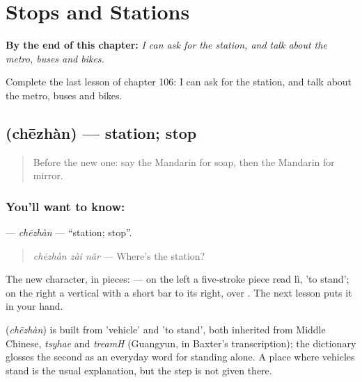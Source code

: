 
\chapter{Stops and Stations}
\label{ch:zh-stops-and-stations}

\begin{chapteropening}
\textbf{By the end of this chapter:} \emph{I can ask for the station, and talk about the metro, buses and bikes.}

Complete the last lesson of chapter 106: I can ask for the station, and talk about the metro, buses and bikes.
\end{chapteropening}

\section[\texorpdfstring{\zh{车站} (chēzhàn)}{车站 (chēzhàn)}]{ (chēzhàn) — station; stop}

\label{lesson:ZH-C106-chezhan}



\begin{quote}
Before the new one: say the Mandarin for soap, then the Mandarin for mirror.
\end{quote}

\subsection*{You'll want to know: }
\textbf{} — \emph{chēzhàn} — \textquotedblleft{}station; stop\textquotedblright{}.

\begin{quote}
\textbf{} \emph{chēzhàn zài nǎr} — Where's the station?
\end{quote}

The new character, in pieces:  — on the left a five-stroke piece read lì, 'to stand'; on the right a vertical with a short bar to its right, over . The next lesson puts it in your hand.

\begin{cousinweb}
\textbf{} (\emph{chēzhàn}) is built from  'vehicle' and  'to stand', both inherited from Middle Chinese, \emph{tsyhae} and \emph{treamH} (Guangyun, in Baxter's transcription); the dictionary glosses the second as an everyday word for standing alone. A place where vehicles stand is the usual explanation, but the step is not given there.
\end{cousinweb}


